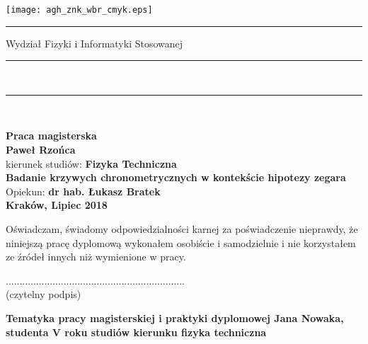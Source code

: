 \pagestyle{empty}
\texttt{[image: agh\_znk\_wbr\_cmyk.eps]}\\
\rule{30mm}{0pt}
{\large\textsf{Wydział Fizyki i Informatyki Stosowanej}}\\
\rule{\textwidth}{3pt}\\
\rule[2ex]
{\textwidth}{1pt}\\
\vspace{7ex}
\begin{center}
{\bf\LARGE\textsf{Praca magisterska}}\\
\vspace{13ex}
{\bf\Large\textsf{Paweł Rzońca}}\\
\vspace{3ex}
{\sf \small kierunek studiów:} {\bf\small\textsf{Fizyka Techniczna}}\\
\vspace{15ex}
{\bf\huge\textsf{Badanie krzywych chronometrycznych w kontekście hipotezy zegara}}\\
\vspace{14ex}
{\sf \Large Opiekun:} {\bf\Large\textsf{dr hab. Łukasz Bratek}}\\
\vspace{22ex}
\textsf{\bf\large\textsf{Kraków, Lipiec 2018}}
\end{center}
\newpage
{\sf Oświadczam, świadomy odpowiedzialności karnej za poświadczenie nieprawdy,
że niniejszą pracę dyplomową wykonałem osobiście i samodzielnie i nie korzystałem
ze źródeł innych niż wymienione w pracy.}

\vspace{14ex}

\begin{flushright}
................................................................. \\
{\sf (czytelny podpis)}
\end{flushright}
\newpage

\newpage
{}
\begin{center}
{\bf Tematyka pracy magisterskiej i praktyki dyplomowej
Jana Nowaka,
studenta V roku studiów kierunku fizyka techniczna}\\
\end{center}

